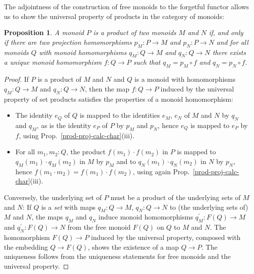 \documentclass{amsart}
\theoremstyle{plain}
\numberwithin{equation}{section} %
\numberwithin{figure}{section} %
\theoremstyle{plain}
\theoremstyle{plain}
\theoremstyle{plain}
\theoremstyle{plain}
\theoremstyle{plain}
\newtheorem{prop}[thm]{Proposition} %
\theoremstyle{plain}
\theoremstyle{remark}
\theoremstyle{remark}
\theoremstyle{remark}
\begin{document}
The adjointness of the construction of free monoids to the forgetful functor allows us to show the universal property of products in the category of monoids:
\begin{prop}  %
A monoid $P$ is a product of two monoids $M$ and $N$ if, and only if there are two projection homomorphisms $p_M : P \rightarrow M$ and $p_N : P \rightarrow N$ and for all monoids $Q$ with monoid homomorphisms $q_M : Q \rightarrow M$ and  $q_N : Q \rightarrow N$ there exists a unique monoid homomorphism $f : Q \rightarrow P$ such that $q_M = p_M \circ f$ and $q_N = p_N \circ f$.
\end{prop}
\begin{proof}
If $P$ is a product of $M$ and $N$ and $Q$ is a monoid with homomorphisms $q_M : Q \rightarrow M$ and  $q_N : Q \rightarrow N$, then the map $f : Q \rightarrow P$ induced by the universal property of set products satisfies the properties of a monoid homomorphism:
\begin{itemize}
\item The identity $e_Q$ of $Q$ is mapped to the identities $e_M$, $e_N$ of $M$ and $N$ by $q_N$ and $q_M$, as is the identity $e_P$ of $P$ by $p_M$ and $p_N$, hence $e_Q$ is mapped to $e_P$ by $f$, using Prop.~\ref{prod-proj-calc-char}(iii).
\item For all $m_1, m_2 : Q$, the product $f(m_1) \cdot f(m_2)$ in $P$ is mapped to $q_M(m_1) \cdot q_M(m_2)$ in $M$ by $p_M$ and to $q_N(m_1) \cdot q_N(m_2)$ in $N$ by $p_N$, hence $f(m_1 \cdot m_2) = f(m_1) \cdot f(m_2)$, using again Prop.~\ref{prod-proj-calc-char}(iii).
\end{itemize}

Conversely, the underlying set of $P$ must be a product of the underlying sets of $M$ and $N$: If $Q$ is a \textit{set} with maps $q_M : Q \rightarrow M$, $q_N : Q \rightarrow N$ to (the underlying sets of) $M$ and $N$, the maps $q_M$ and $q_N$ induce monoid homomorphisms $q_M^\prime : F(Q) \rightarrow M$ and $q_N^\prime : F(Q) \rightarrow N$ from the free monoid $F(Q)$ on $Q$ to $M$ and $N$. The homomorphism $F(Q) \rightarrow P$ induced by the universal property, composed with the embedding $Q \rightarrow F(Q)$, shows the existence of a map $Q \rightarrow P$. The uniqueness follows from the uniqueness statements for free monoids and the universal property.
\end{proof}
\end{document}
